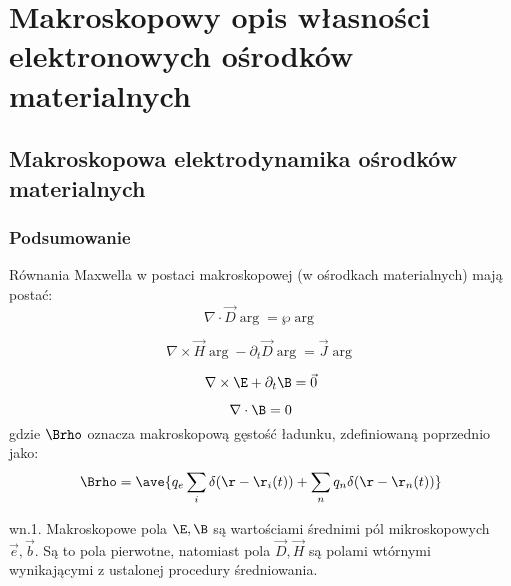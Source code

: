 \section{Makroskopowy opis własności elektronowych ośrodków materialnych}
\subsection{Makroskopowa elektrodynamika ośrodków materialnych}
\subsubsection{Podsumowanie}
Równania Maxwella w postaci makroskopowej (w ośrodkach materialnych) mają postać:
\begin{equation} \nabla \cdot \vec{D}\arg=\wp\arg \label{r1}
 \end{equation}
 
\begin{equation} \nabla \times \vec{H}\arg-\partial_t\vec{D}\arg=\vec{J}\arg \label{r2}
\end{equation}

\begin{equation} \nabla \times \E+\partial_t \B=\vec{0} \label{r3}\end{equation} 

\begin{equation} \nabla \cdot \B=0 \end{equation}
gdzie $\Brho$ oznacza makroskopową gęstość ładunku, zdefiniowaną poprzednio jako: $$\Brho=\ave{q_e\sum_i\delta(\r-\r_i(t))+\sum_nq_n\delta(\r-\r_n(t))}$$

wn.1. Makroskopowe pola $\E,\B$ są wartościami średnimi pól mikroskopowych $\vec{e},\vec{b}$. Są to pola pierwotne, natomiast pola $\vec{D},\vec{H}$ są polami wtórnymi wynikającymi z ustalonej procedury średniowania.

